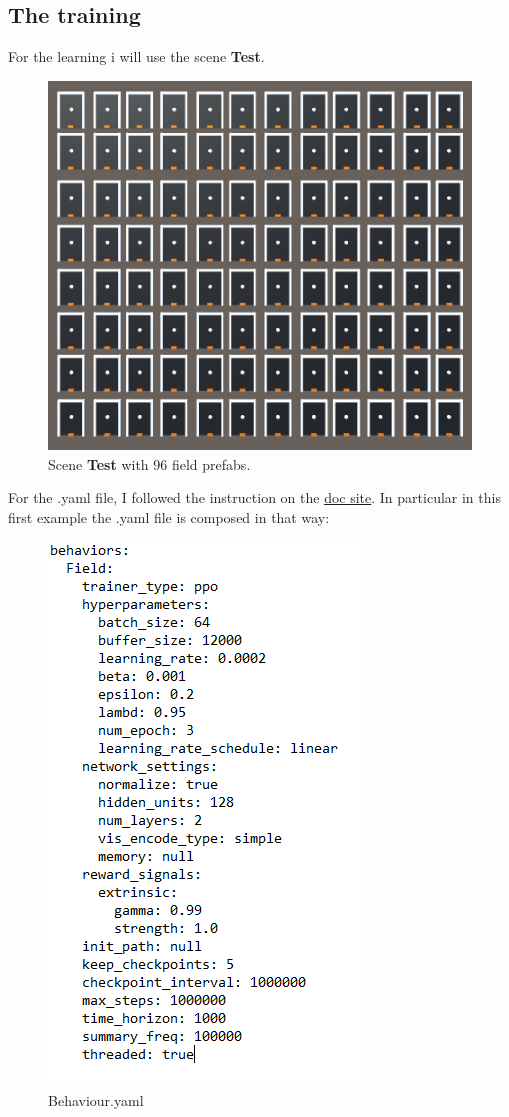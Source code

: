 \documentclass[12pt]{article}
\begin{document}
	\subsection{The training}
	For the learning i will use the scene \textbf{Test}.
	
	\begin{figure}[hbt!]
		\centering
		\includegraphics[width= 0.76
		\textwidth]{images/NormalTraining1.png}
		\caption{Scene \textbf{Test} with 96 field prefabs.}
	\end{figure}
	
	\newpage
	
	\noindent
	For the .yaml file, I followed the instruction on the \href{https://github.com/Unity-Technologies/ml-agents/blob/master/docs/Training-Configuration-File.md}{doc site}. 
	In particular in this first example the .yaml file is composed in that way:
	
	\begin{figure}[hbt!]
		\centering
		\includegraphics[width= 0.6
		\textwidth]{images/Behaviour.png}
		\caption{Behaviour.yaml}
	\end{figure}
	
\end{document}
